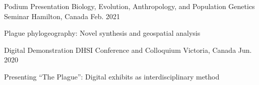

\begin{cventries}

  \cventry
    {Podium Presentation} %
    {Biology, Evolution, Anthropology, and Population Genetics Seminar} %
    {Hamilton, Canada} %
    {Feb. 2021} %
    {
      \begin{cvitems} %
        \item {Plague phylogeography: Novel synthesis and geospatial analysis}
      \end{cvitems}
    }
    
  \cventry
    {Digital Demonstration} %
    {DHSI Conference and Colloquium} %
    {Victoria, Canada} %
    {Jun. 2020} %
    {
      \begin{cvitems} %
        \item {Presenting “The Plague”: Digital exhibits as interdisciplinary method}
      \end{cvitems}
    }
    

\end{cventries}
